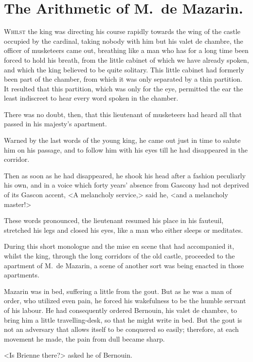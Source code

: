 \chapter{The Arithmetic of M.~de Mazarin.}

\lettrine{W}{hilst} the king was directing his course rapidly towards the wing of the castle occupied by the cardinal, taking nobody with him but his valet de chambre, the officer of musketeers came out, breathing like a man who has for a long time been forced to hold his breath, from the little cabinet of which we have already spoken, and which the king believed to be quite solitary. This little cabinet had formerly been part of the chamber, from which it was only separated by a thin partition. It resulted that this partition, which was only for the eye, permitted the ear the least indiscreet to hear every word spoken in the chamber.

There was no doubt, then, that this lieutenant of musketeers had heard all that passed in his majesty's apartment.

Warned by the last words of the young king, he came out just in time to salute him on his passage, and to follow him with his eyes till he had disappeared in the corridor.

Then as soon as he had disappeared, he shook his head after a fashion peculiarly his own, and in a voice which forty years' absence from Gascony had not deprived of its Gascon accent, <A melancholy service,> said he, <and a melancholy master!>

These words pronounced, the lieutenant resumed his place in his fauteuil, stretched his legs and closed his eyes, like a man who either sleeps or meditates.

During this short monologue and the mise en scene that had accompanied it, whilst the king, through the long corridors of the old castle, proceeded to the apartment of M.~de Mazarin, a scene of another sort was being enacted in those apartments.

Mazarin was in bed, suffering a little from the gout. But as he was a man of order, who utilized even pain, he forced his wakefulness to be the humble servant of his labour. He had consequently ordered Bernouin, his valet de chambre, to bring him a little travelling-desk, so that he might write in bed. But the gout is not an adversary that allows itself to be conquered so easily; therefore, at each movement he made, the pain from dull became sharp.

<Is Brienne there?> asked he of Bernouin.

